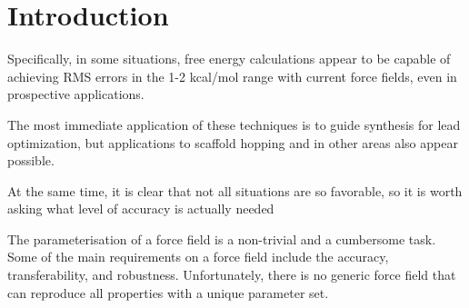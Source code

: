 \chapter{Introduction} %

\label{Chapter1} %
Specifically, in some
situations, free energy calculations appear to be capable
of achieving RMS errors in the 1-2 kcal/mol range with
current force fields, even in prospective applications.

The most immediate application of these techniques is to guide synthesis for lead optimization, but applications to scaffold
hopping and in other areas also appear possible.

At the same time, it is clear that not all situations are
so favorable, so it is worth asking what level of accuracy
is actually needed


The parameterisation of a force field is a non-trivial and a cumbersome task. Some of
the main requirements on a force field include the accuracy, transferability, and robustness. Unfortunately, there is no generic force field that can reproduce all properties with a
unique parameter set.

